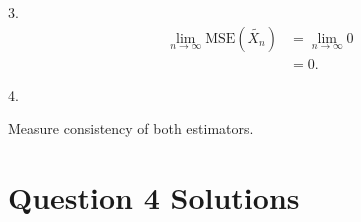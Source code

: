 \documentclass{article}
\begin{document}
3.
\begin{align*}
    \lim_{n\rightarrow\infty}\mbox{MSE}(\tilde{X_n}) &= \lim_{n\rightarrow\infty}0\\
    &= 0\mbox{.}
\end{align*}

4.

Measure consistency of both estimators.

\section*{Question 4 Solutions} %
\end{document}

